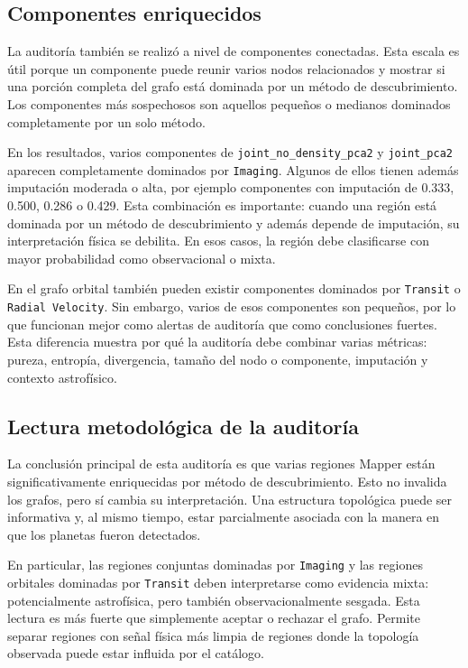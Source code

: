 \subsection*{Componentes enriquecidos}

La auditoría también se realizó a nivel de componentes conectadas. Esta escala es útil porque un componente puede reunir varios nodos relacionados y mostrar si una porción completa del grafo está dominada por un método de descubrimiento. Los componentes más sospechosos son aquellos pequeños o medianos dominados completamente por un solo método.



En los resultados, varios componentes de \texttt{joint\_no\_density\_pca2} y \texttt{joint\_pca2} aparecen completamente dominados por \texttt{Imaging}. Algunos de ellos tienen además imputación moderada o alta, por ejemplo componentes con imputación de 0.333, 0.500, 0.286 o 0.429. Esta combinación es importante: cuando una región está dominada por un método de descubrimiento y además depende de imputación, su interpretación física se debilita. En esos casos, la región debe clasificarse con mayor probabilidad como observacional o mixta.

En el grafo orbital también pueden existir componentes dominados por \texttt{Transit} o \texttt{Radial Velocity}. Sin embargo, varios de esos componentes son pequeños, por lo que funcionan mejor como alertas de auditoría que como conclusiones fuertes. Esta diferencia muestra por qué la auditoría debe combinar varias métricas: pureza, entropía, divergencia, tamaño del nodo o componente, imputación y contexto astrofísico.

\subsection*{Lectura metodológica de la auditoría}

La conclusión principal de esta auditoría es que varias regiones Mapper están significativamente enriquecidas por método de descubrimiento. Esto no invalida los grafos, pero sí cambia su interpretación. Una estructura topológica puede ser informativa y, al mismo tiempo, estar parcialmente asociada con la manera en que los planetas fueron detectados.

En particular, las regiones conjuntas dominadas por \texttt{Imaging} y las regiones orbitales dominadas por \texttt{Transit} deben interpretarse como evidencia mixta: potencialmente astrofísica, pero también observacionalmente sesgada. Esta lectura es más fuerte que simplemente aceptar o rechazar el grafo. Permite separar regiones con señal física más limpia de regiones donde la topología observada puede estar influida por el catálogo.

